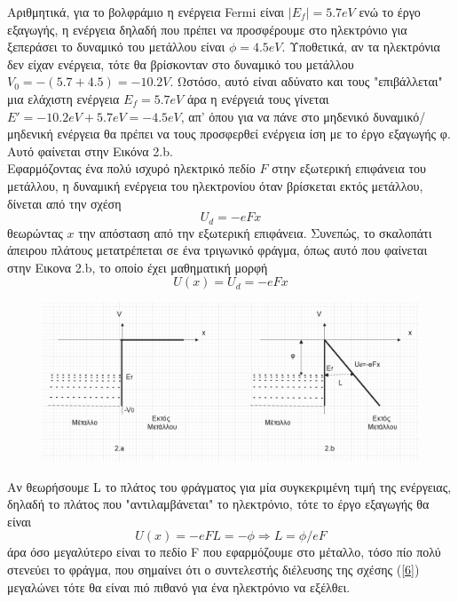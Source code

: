 \documentclass[a4paper]{article}
\begin{document}
Αριθμητικά, για το βολφράμιο η ενέργεια Fermi είναι $|E_f|=5.7eV$ ενώ το έργο εξαγωγής, η ενέργεια δηλαδή που πρέπει να προσφέρουμε στο ηλεκτρόνιο για ξεπεράσει το δυναμικό του μετάλλου είναι $\phi=4.5eV$. Υποθετικά, αν τα ηλεκτρόνια δεν είχαν ενέργεια, τότε θα  βρίσκονταν στο δυναμικό του μετάλλου $V_0=-(5.7+4.5)=-10.2V$. Ωστόσο, αυτό είναι αδύνατο και τους "επιβάλλεται" μια ελάχιστη ενέργεια $E_f=5.7eV$ άρα 
η ενέργειά τους γίνεται $E'=-10.2eV+5.7eV=-4.5eV$, απ' όπου για να πάνε στο μηδενικό δυναμικό/μηδενική ενέργεια θα πρέπει να τους προσφερθεί ενέργεια ίση με το έργο εξαγωγής φ.
Αυτό φαίνεται στην Εικόνα 2.b.
\\
Εφαρμόζοντας ένα πολύ ισχυρό ηλεκτρικό πεδίο $F$ στην εξωτερική επιφάνεια του μετάλλου, η δυναμική ενέργεια του ηλεκτρονίου όταν βρίσκεται εκτός μετάλλου, δίνεται από την σχέση
\begin{equation}
U_d = - e F x
\end{equation}
θεωρώντας $x$ την απόσταση από την εξωτερική επιφάνεια.
Συνεπώς, το σκαλοπάτι άπειρου πλάτους μετατρέπεται σε ένα τριγωνικό φράγμα, όπως αυτό που φαίνεται στην Εικονα 2.b, το οποίο έχει μαθηματική μορφή
\begin{equation}
U(x)=U_d = -eFx %
\end{equation}

\begin{figure}[h!]
\centering
\includegraphics[scale=0.4]{poten.png}
\caption{ }
\end{figure}

Αν θεωρήσουμε L το πλάτος του φράγματος για μία συγκεκριμένη τιμή της ενέργειας, δηλαδή το πλάτος που "αντιλαμβάνεται" το ηλεκτρόνιο, τότε το έργο εξαγωγής θα είναι 
\begin{equation}
U(x)=-eFL=-\phi \Rightarrow L = \phi/eF
\end{equation}
άρα όσο μεγαλύτερο είναι το πεδίο F που εφαρμόζουμε στο μέταλλο, τόσο πίο πολύ στενεύει το φράγμα, που σημαίνει ότι ο συντελεστής διέλευσης της σχέσης (\ref{6}) μεγαλώνει τότε θα είναι πιό πιθανό για ένα ηλεκτρόνιο να εξέλθει.\footnotemark
\end{document}
